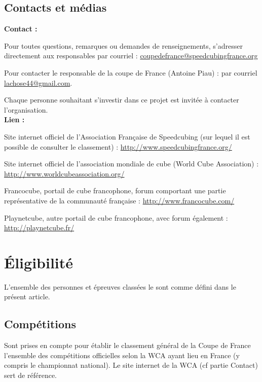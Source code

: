 \documentclass[10pt,a4paper]{article}
\newcommand{\3}{$3\times3$}
\newcommand{\4}{$4\times4$}
\newcommand{\2}{$2\times2$}
\begin{document}
\subsection{Contacts et médias}
\begin{em}

\textbf{Contact :}

Pour toutes questions, remarques ou demandes de renseignements, s'adresser directement aux responsables par courriel : \href{mailto:coupedefrance@speedcubingfrance.org}{coupedefrance@speedcubingfrance.org}

Pour contacter le responsable de la coupe de France (Antoine Piau) : par courriel 
\href{mailto:lachose44@gmail.com}{lachose44@gmail.com}.

Chaque personne souhaitant s'investir dans ce projet est invitée à contacter l'organisation.
\\

\textbf{Lien :}

Site internet officiel de l'Association Française de Speedcubing (sur lequel il est possible de consulter le classement) : \url{http://www.speedcubingfrance.org/}

Site internet officiel de l'association mondiale de cube (World Cube Association) : \url{http://www.worldcubeassociation.org/}

Francocube, portail de cube francophone, forum comportant une partie représentative de la communauté française : \url{http://www.francocube.com/}

Playnetcube, autre portail de cube francophone, avec forum également : \url{http://playnetcube.fr/}

\end{em}

\section{Éligibilité}

L'ensemble des personnes et épreuves classées le sont comme défini dans le présent article.

\subsection{Compétitions}

Sont prises en compte pour établir le classement général de la Coupe de France l'ensemble des compétitions officielles selon la WCA ayant lieu en France (y compris le championnat national). Le site internet de la WCA (cf partie Contact) sert de référence.
\end{document}
